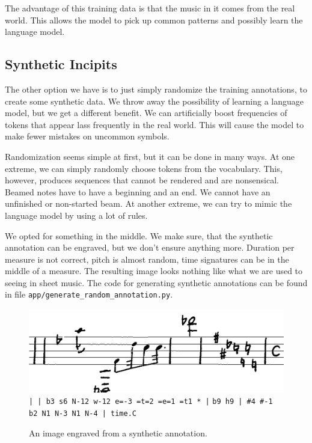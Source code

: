 The advantage of this training data is that the music in it comes from the real world. This allows the model to pick up common patterns and possibly learn the language model.


\subsection{Synthetic Incipits}

The other option we have is to just simply randomize the training annotations, to create some synthetic data. We throw away the possibility of learning a language model, but we get a different benefit. We can artificially boost frequencies of tokens that appear lass frequently in the real world. This will cause the model to make fewer mistakes on uncommon symbols.

Randomization seems simple at first, but it can be done in many ways. At one extreme, we can simply randomly choose tokens from the vocabulary. This, however, produces sequences that cannot be rendered and are nonsensical. Beamed notes have to have a beginning and an end. We cannot have an unfinished or non-started beam. At another extreme, we can try to mimic the language model by using a lot of rules.

We opted for something in the middle. We make sure, that the synthetic annotation can be engraved, but we don't ensure anything more. Duration per measure is not correct, pitch is almost random, time signatures can be in the middle of a measure. The resulting image looks nothing like what we are used to seeing in sheet music. The code for generating synthetic annotations can be found in file \verb`app/`\allowbreak\verb`generate_`\allowbreak\verb`random_`\allowbreak\verb`annotation.py`.

\begin{figure}[h]
    \centering
    \includegraphics[width=140mm]{../img/synthetic-incipit}
    \verb`| | b3 s6 N-12 w-12 e=-3 =t=2 =e=1 =t1 * |`
    \verb`b9 h9 | #4 #-1 b2 N1 N-3 N1 N-4 | time.C`
    \caption{An image engraved from a synthetic annotation.}
    \label{fig6:SyntheticIncipit}
\end{figure}

